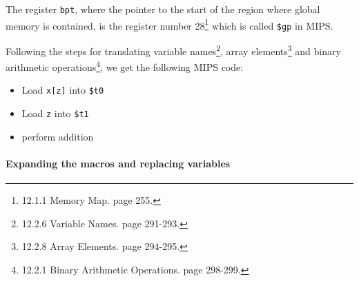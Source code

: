 \documentclass{article}
\begin{document}
\begin{enumerate}
{            The register \verb|bpt|, where the pointer to the start of the region where global memory is contained, is the register number 28\footnote{12.1.1 Memory Map. page 255.} which is called \verb|$gp| in MIPS.

			Following the steps for translating variable names\footnote{12.2.6 Variable Names. page 291-293.}, array elements\footnote{12.2.8 Array Elements. page 294-295.} and binary arithmetic operations\footnote{\label{binary_arithmetic_operations_footnote}12.2.1 Binary Arithmetic Operations. page 298-299.}, we get the following MIPS code:

            \begin{itemize}
                \item {
                    Load \verb|x[z]| into \verb|$t0|
                    
                }
                \item {
                    Load \verb|z| into \verb|$t1|
                    
                }
                \item {
                    perform addition
                    
                }
            \end{itemize}

			\paragraph{Expanding the macros and replacing variables}

}
\end{enumerate}
\end{document}
